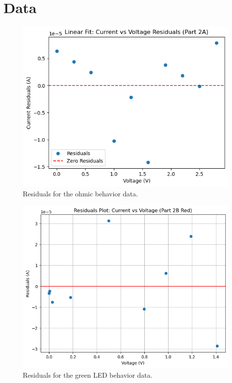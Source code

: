 \documentclass[11pt]{article}
\let\oldsection\section
\renewcommand\section{\clearpage\oldsection}
\begin{document}
    \appendix
    \section{Data}\label{sec:data}

    \begin{figure}[h!]
        \centering
        \includegraphics[width=1.0\linewidth]{resources/images/2a_residuals}
        \caption{Residuals for the ohmic behavior data.}
        \label{fig:ohmic_residuals}
    \end{figure}

    \begin{figure}[h!]
        \centering
        \includegraphics[width=1.0\linewidth]{resources/images/2b2_residuals}
        \caption{Residuals for the green LED behavior data.}
        \label{fig:non_ohmic_residuals_green}
    \end{figure}
\end{document}
